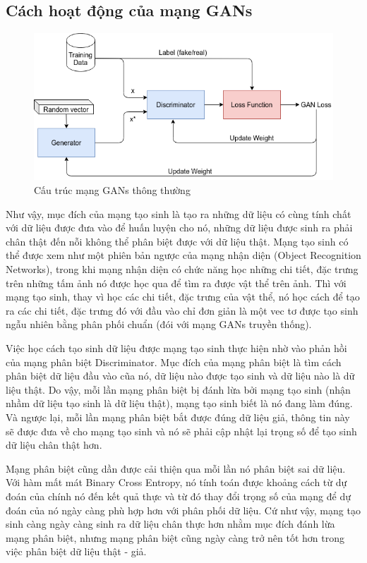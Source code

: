 \subsection{Cách hoạt động của mạng GANs}
\begin{figure}[H]
    \centering
    \includegraphics[width=15cm]{./content/materials/gans-pure.png}
    \caption{Cấu trúc mạng GANs thông thường}
    \label{fig:pure-gans}
\end{figure}

Như vậy, mục đích của mạng tạo sinh là tạo ra những dữ liệu có cùng tính chất với dữ liệu được đưa vào để huấn luyện cho nó, những dữ liệu được sinh ra phải chân thật đến nỗi không thể phân biệt được với dữ liệu thật. Mạng tạo sinh có thể được xem như một phiên bản ngược của mạng nhận diện (Object Recognition Networks), trong khi mạng nhận diện có chức năng học những chi tiết, đặc trưng trên những tấm ảnh nó được học qua để tìm ra được vật thể trên ảnh. Thì với mạng tạo sinh, thay vì học các chi tiết, đặc trưng của vật thể, nó học cách để tạo ra các chi tiết, đặc trưng đó với đầu vào chỉ đơn giản là một vec tơ được tạo sinh ngẫu nhiên bằng phân phối chuẩn (đói với mạng GANs truyền thống). 

Việc học cách tạo sinh dữ liệu được mạng tạo sinh thực hiện nhờ vào phản hồi của mạng phân biệt Discriminator. Mục đích của mạng phân biệt là tìm cách phân biệt dữ liệu đầu vào cũa nó, dữ liệu nào được tạo sinh và dữ liệu nào là dữ liệu thật. Do vậy, mỗi lần mạng phân biệt bị đánh lừa bởi mạng tạo sinh (nhận nhầm dữ liệu tạo sinh là dữ liệu thật), mạng tạo sinh biết là nó đang làm đúng. Và ngược lại, mỗi lần mạng phân biệt bắt được đúng dữ liệu giả, thông tin này sẽ được đưa về cho mạng tạo sinh và nó sẽ phải cập nhật lại trọng số để tạo sinh dữ liệu chân thật hơn.

Mạng phân biệt cũng dần được cải thiện qua mỗi lần nó phân biệt sai dữ liệu. Với hàm mất mát Binary Cross Entropy, nó tính toán được khoảng cách từ dự đoán của chính nó đến kết quả thực và từ đó thay đổi trọng số của mạng để dự đoán của nó ngày càng phù hợp hơn với phân phối dữ liệu. Cứ như vậy, mạng tạo sinh càng ngày càng sinh ra dữ liệu chân thực hơn nhằm mục đích đánh lừa mạng phân biệt, nhưng mạng phân biệt cũng ngày càng trở nên tốt hơn trong việc phân biệt dữ liệu thật - giả.

